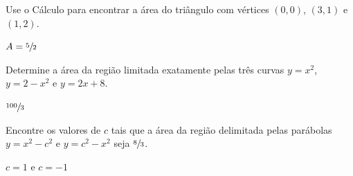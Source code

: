 \begin{exercises}
\begin{exercise}
Use o Cálculo para encontrar a área do triângulo com vértices
$(0, 0)$, $(3, 1)$ e $(1, 2)$.
\begin{answer}
  $A= \sfrac{5}{2}$
\end{answer}
\end{exercise}


\begin{exercise}
Determine a área da região limitada exatamente pelas três curvas
$y =x^2$, $y = 2- x^2$ e $y = 2x + 8$.
\begin{answer}
  $\sfrac{100}{3}$
\end{answer}
\end{exercise}

\begin{exercise}
  Encontre os valores de $c$ tais que a área da região delimitada pelas
  parábolas $y = x^2 - c^2$ e $y=c^2-x^2$ seja $\sfrac{8}{3}$.
\begin{answer}
  $c=1$ e $c=-1$
\end{answer}
\end{exercise}



\end{exercises}

